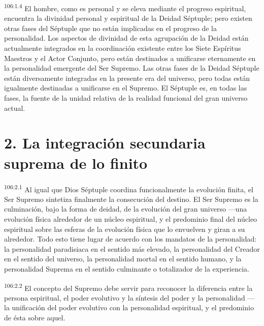 \par
\textsuperscript{106:1.4} El hombre, como es personal y se eleva mediante el progreso espiritual, encuentra la divinidad personal y espiritual de la Deidad Séptuple; pero existen otras fases del Séptuple que no están implicadas en el progreso de la personalidad. Los aspectos de divinidad de esta agrupación de la Deidad están actualmente integrados en la coordinación existente entre los Siete Espíritus Maestros y el Actor Conjunto, pero están destinados a unificarse eternamente en la personalidad emergente del Ser Supremo. Las otras fases de la Deidad Séptuple están diversamente integradas en la presente era del universo, pero todas están igualmente destinadas a unificarse en el Supremo. El Séptuple es, en todas las fases, la fuente de la unidad relativa de la realidad funcional del gran universo actual.

\section*{2. La integración secundaria suprema de lo finito}
\par
\textsuperscript{106:2.1} Al igual que Dios Séptuple coordina funcionalmente la evolución finita, el Ser Supremo sintetiza finalmente la consecución del destino. El Ser Supremo es la culminación, bajo la forma de deidad, de la evolución del gran universo ---una evolución física alrededor de un núcleo espiritual, y el predominio final del núcleo espiritual sobre las esferas de la evolución física que lo envuelven y giran a su alrededor. Todo esto tiene lugar de acuerdo con los mandatos de la personalidad: la personalidad paradisiaca en el sentido más elevado, la personalidad del Creador en el sentido del universo, la personalidad mortal en el sentido humano, y la personalidad Suprema en el sentido culminante o totalizador de la experiencia.

\par
\textsuperscript{106:2.2} El concepto del Supremo debe servir para reconocer la diferencia entre la persona espiritual, el poder evolutivo y la síntesis del poder y la personalidad ---la unificación del poder evolutivo con la personalidad espiritual, y el predominio de ésta sobre aquel.

